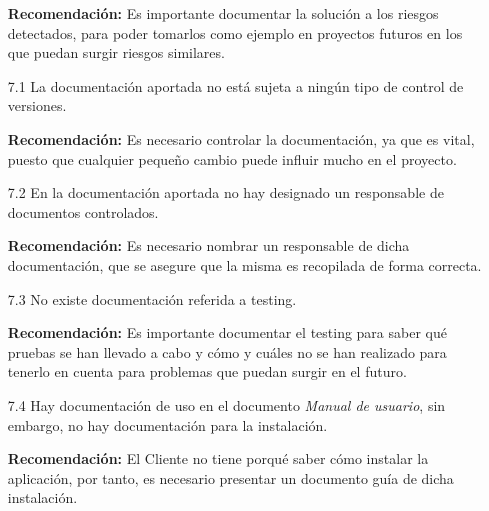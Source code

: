 \documentclass[a4paper,12pt]{report}
\begin{document}
\begin{enumerate}
    \vspace{0.05cm}
    
    \textbf{Recomendación:} Es importante documentar la solución a los riesgos detectados, para poder tomarlos como ejemplo en proyectos futuros en los que puedan surgir riesgos similares. \\
    
    \vspace{0.05cm}
    
    \item[7.1] La documentación aportada no está sujeta a ningún tipo de control de versiones.\\
    
    \vspace{0.05cm}
    
    \textbf{Recomendación:} Es necesario controlar la documentación, ya que es vital, puesto que cualquier pequeño cambio puede influir mucho en el proyecto.\\
    
    \vspace{0.05cm}
    
    \item[7.2] En la documentación aportada no hay designado un responsable de documentos controlados.\\
    
    \vspace{0.05cm}
    
    \textbf{Recomendación:} Es necesario nombrar un responsable de dicha documentación, que se asegure que la misma es recopilada de forma correcta. \\
    
    \vspace{0.05cm}
    
    \item[7.3] No existe documentación referida a testing. \\
    
    \vspace{0.05cm}
    
    \textbf{Recomendación:} Es importante documentar el testing para saber qué pruebas se han llevado a cabo y cómo y cuáles no se han realizado para tenerlo en cuenta para problemas que puedan surgir en el futuro. \\
    
    \vspace{0.05cm}
    
    \item[7.4] Hay documentación de uso en el documento  \textit{Manual de usuario}, sin embargo, no hay documentación para la instalación.\\
    
    \vspace{0.05cm}
    
    \textbf{Recomendación:} El Cliente no tiene porqué saber cómo instalar la aplicación, por tanto, es necesario presentar un documento guía de dicha instalación.\\
    
    \vspace{0.05cm}
\end{enumerate}
\end{document}
